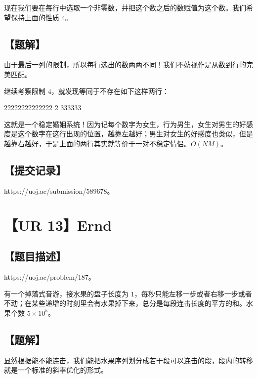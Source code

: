 \documentclass[UTF8,12pt,a4paper]{ctexart}
\begin{document}
	现在我们要在每行中选取一个非零数，并把这个数之后的数赋值为这个数。我们希望保持上面的性质 4。
	
	\subsection*{【题解】}
	
	由于最后一列的限制，所以每行选出的数两两不同！我们不妨视作是从数到行的完美匹配。
	
	继续考察限制 $4$，就发现等同于不存在如下这样两行：
	
	22222222222222
	   2    333333
	   
	这就是一个稳定婚姻系统！因为记每个数字为女生，行为男生，女生对男生的好感度是这个数字在这行出现的位置，越靠左越好；男生对女生的好感度也类似，但是越靠右越好，于是上面的两行其实就等价于一对不稳定情侣。$O(NM)$。
	
	\subsection*{【提交记录】}
	
	https://uoj.ac/submission/589678。
	
	
	\section*{【UR 13】Ernd}
	
	\subsection*{【题目描述】}
	
	https://uoj.ac/problem/187。
	
	有一个掉落式音游，接水果的盘子长度为 $1$，每秒只能左移一步或者右移一步或者不动；在某些递增的时刻里会有水果掉下来，总分是每段连击长度的平方的和。水果个数 $5\times 10^5$。
	
	\subsection*{【题解】}
	
	显然根据能不能连击，我们能把水果序列划分成若干段可以连击的段，段内的转移就是一个标准的斜率优化的形式。
	
\end{document}
